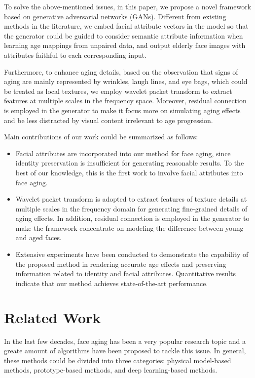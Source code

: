 \documentclass[letterpaper]{article} %
\begin{document}
To solve the above-mentioned issues, in this paper, we propose a novel framework based on generative adversarial networks (GANs). 
Different from existing methods in the literature, we embed facial attribute vectors in the model so that the generator could be guided to consider semantic attribute information when learning age mappings from unpaired data, and output elderly face images with attributes faithful to each corresponding input.

Furthermore, to enhance aging details, based on the observation that signs of aging are mainly represented by wrinkles, laugh lines, and eye bags, which could be treated as local textures, we employ wavelet packet transform to extract features at multiple scales in the frequency space. 
Moreover, residual connection is employed in the generator to make it focus more on simulating aging effects and be less distracted by visual content irrelevant to age progression.

Main contributions of our work could be summarized as follows:
\begin{itemize}
\item Facial attributes are incorporated into our method for face aging, since identity preservation is insufficient for generating reasonable results. To the best of our knowledge, this is the first work to involve facial attributes into face aging.

\item Wavelet packet transform is adopted to extract features of texture details at multiple scales in the frequency domain for generating fine-grained details of aging effects.
In addition, residual connection is employed in the generator to make the framework concentrate on modeling the difference between young and aged faces.

\item Extensive experiments have been conducted to demonstrate the capability of the proposed method in rendering accurate age effects and preserving information related to identity and facial attributes. Quantitative results indicate that our method achieves state-of-the-art performance.
\end{itemize}

\section{Related Work}
In the last few decades, face aging has been a very popular research topic and a greate amount of algorithms have been proposed to tackle this issue. 
In general, these methods could be divided into three categories: physical model-based methods, prototype-based methods, and deep learning-based methods.
\end{document}
